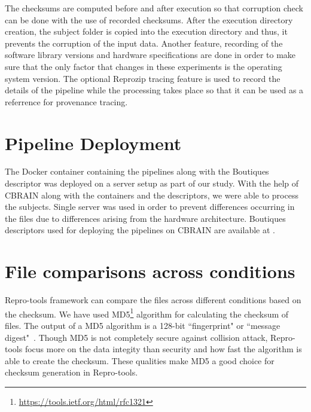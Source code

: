The checksums are computed before and after execution so that corruption check can be done with the use of recorded checksums. After the execution directory creation, the subject folder is copied into the execution directory and thus, it prevents the corruption of the input data. Another feature, recording of the software library versions and hardware specifications are done in order to make sure that the only factor that changes in these experiments is the operating system version. The optional Reprozip tracing feature is used to record the details of the pipeline while the processing takes place so that it can be used as a referrence for provenance tracing.

\section{Pipeline Deployment}
The Docker container containing the pipelines along with the Boutiques descriptor was deployed on a server setup as part of our study. With the help of CBRAIN along with the containers and the descriptors, we were able to process the subjects. Single server was used in order to prevent differences occurring in the files due to differences arising from the hardware architecture. Boutiques descriptors used for deploying the pipelines on CBRAIN are available at \cite{HCP_descriptors}.


\section{File comparisons across conditions}
Repro-tools framework can compare the files across different conditions based on the checksum. We have used MD5\footnote{\url{https://tools.ietf.org/html/rfc1321}} algorithm for calculating the checksum of files. The output of a MD5 algorithm is a 128-bit ``fingerprint" or ``message digest"~\cite{md5}. Though MD5 is not completely secure against collision attack, Repro-tools focus more on the data integity than security and how fast the algorithm is able to create the checksum. These qualities make MD5 a good choice for checksum generation in Repro-tools.

